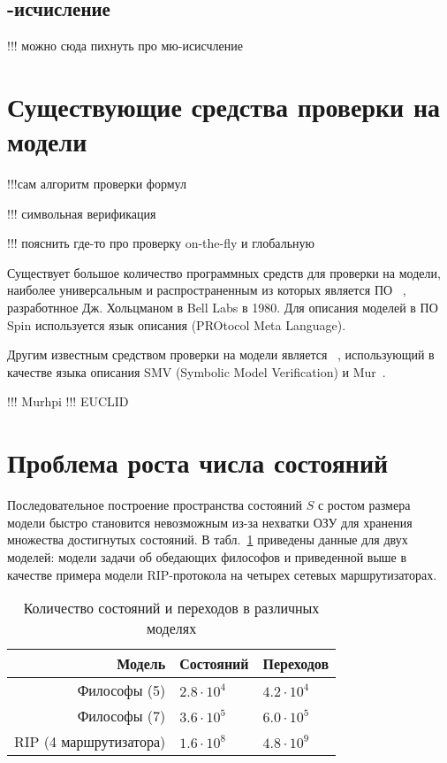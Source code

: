 \documentclass[a4paper,notitlepage,14pt]{article}
\begin{document}
\subsection{\mu-исчисление}
\label{sec:mu-calculus}

!!! можно сюда пихнуть про мю-исисчление

\section{Существующие средства проверки на модели}
\label{sec:existing-tools}

!!!сам алгоритм проверки формул

!!! символьная верификация

!!! пояснить где-то про проверку on-the-fly и глобальную

Существует большое количество программных средств для проверки на модели, наиболее
универсальным и распространенным из которых является ПО ~\cite{SpinRoot},
разработнное Дж. Хольцманом в Bell Labs в 1980. Для описания моделей в ПО Spin
используется язык описания  (PROtocol Meta Language).

Другим известным средством проверки на модели является
~\cite{Cimatti00nusmv:a}, использующий в качестве языка описания SMV (Symbolic
Model Verification) и Mur\phi~\cite{Dill96murphi}.

!!! Murhpi
!!! EUCLID

\section{Проблема роста числа состояний}
\label{sec:state-explosion}

Последовательное построение пространства состояний $S$ с ростом размера модели быстро
становится невозможным из-за нехватки ОЗУ для хранения множества достигнутых состояний. В
табл.~\ref{tab:models-statecount} приведены данные для двух моделей: модели задачи об
обедающих философов и приведенной выше в качестве примера модели RIP-протокола на четырех
сетевых маршрутизаторах.

\begin{table}
  \centering
  \begin{tabular}{|r|l|l|}
    \hline
    Модель                  & Состояний         & Переходов       \\
    \hline
    Философы (5)            & $2.8 \cdot 10^4$  & $4.2 \cdot 10^4$ \\
    Философы (7)            & $3.6 \cdot 10^5$  & $6.0 \cdot 10^5$ \\
    RIP (4 маршрутизатора)  & $1.6 \cdot 10^8$  & $4.8 \cdot 10^9$ \\
    \hline
  \end{tabular}
  \caption{Количество состояний и переходов в различных моделях}
\label{tab:models-statecount}
\end{table}
\end{document}
